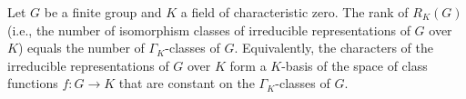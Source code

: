 Let $G$ be a finite group and $K$ a field of characteristic zero. The rank of $R_K(G)$ (i.e., the number of isomorphism classes of irreducible representations of $G$ over $K$) equals the number of $\Gamma_K$-classes of $G$. Equivalently, the characters of the irreducible representations of $G$ over $K$ form a $K$-basis of the space of class functions $f: G \to K$ that are constant on the $\Gamma_K$-classes of $G$.
